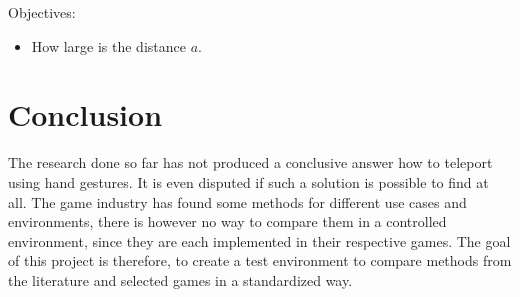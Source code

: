 Objectives:
\begin{itemize}
  \item How large is the distance $a$.
\end{itemize}

\section{Conclusion}
The research done so far has not produced a conclusive answer how to teleport using hand gestures. It is even disputed if such a solution is possible to find at all. The game industry has found some methods for different use cases and environments, there is however no way to compare them in a controlled environment, since they are each implemented in their respective games. The goal of this project is therefore, to create a test environment to compare methods from the literature and selected games in a standardized way. 
